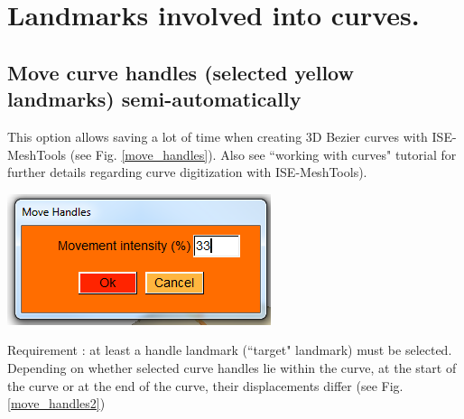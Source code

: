 \section{Landmarks involved into curves.}\label{landmarks_curves_section}

\subsection{Move curve handles (selected yellow
landmarks) semi-automatically}
\noindent
\begin{minipage}{0.5\textwidth}
This option allows saving a lot of time when creating
3D Bezier curves with ISE-MeshTools (see Fig. \ref{move_handles}). Also see ``working
with curves" tutorial for further details regarding curve digitization with ISE-MeshTools).
\end{minipage}    
\begin{minipage}{0.5\textwidth}\centering
  \includegraphics[scale=0.5]{images/Edit_selected_landmarks/Move.png}
 \end{minipage} 
\noindent



Requirement : at least a handle landmark (``target" landmark) must be selected.
Depending on whether selected curve handles lie within the curve, at the start of the curve or at the
end of the curve, their displacements differ (see Fig. \ref{move_handles2})




